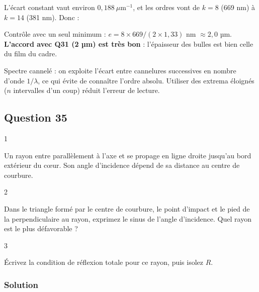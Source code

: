 \documentclass[11pt,a4paper]{article}
\newcommand{\equationajustee}[1]{%
  \sbox{\boiteequation}{$\displaystyle #1$}%
  \ifdim\wd\boiteequation>\linewidth
    \[\resizebox{\linewidth}{!}{\usebox{\boiteequation}}\]%
  \else
    \[#1\]%
  \fi}
\begin{document}
L'écart constant vaut environ \(0{,}188\ \mu\mathrm m^{-1}\), et les ordres vont de \(k=8\) (669 nm) à \(k=14\) (381 nm). Donc :

\equationajustee{2n_\ell e\approx\frac1{0{,}188}\ \mu\mathrm m\approx5{,}3\ \mu\mathrm m}

\equationajustee{\boxed{e\approx2{,}0\ \mu\mathrm m}}

Contrôle avec un seul minimum : \(e=8\times669/(2\times1{,}33)\) nm \(\approx2{,}0\) µm. \textbf{L'accord avec Q31 (2 µm) est très bon} : l'épaisseur des bulles est bien celle du film du cadre.

\begin{methode}

Spectre cannelé : on exploite l'écart entre cannelures successives en nombre d'onde \(1/\lambda\), ce qui évite de connaître l'ordre absolu. Utiliser des extrema éloignés (\(n\) intervalles d'un coup) réduit l'erreur de lecture.

\end{methode}

\hypertarget{question-35}{%
\subsection{Question 35}\label{question-35}}

\begin{indication}{1}

Un rayon entre parallèlement à l'axe et se propage en ligne droite jusqu'au bord extérieur du cœur. Son angle d'incidence dépend de sa distance au centre de courbure.

\end{indication}

\begin{indication}{2}

Dans le triangle formé par le centre de courbure, le point d'impact et le pied de la perpendiculaire au rayon, exprimez le sinus de l'angle d'incidence. Quel rayon est le plus défavorable ?

\end{indication}

\begin{indication}{3}

Écrivez la condition de réflexion totale pour ce rayon, puis isolez \(R\).

\end{indication}

\hypertarget{solution-34}{%
\subsubsection{Solution}\label{solution-34}}
\end{document}
